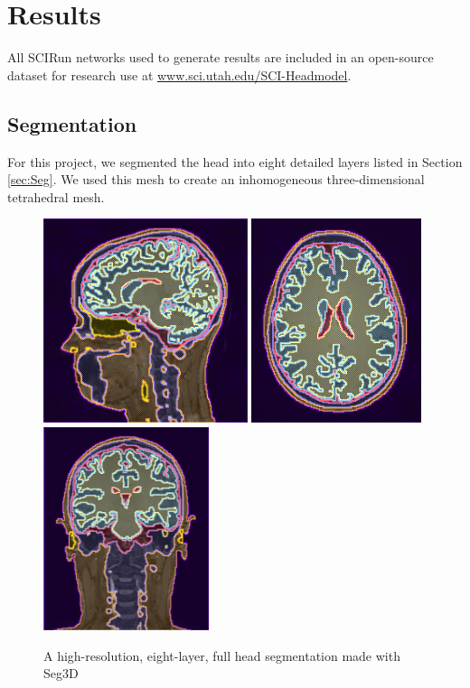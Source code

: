 %

\section{Results}
\label{sec:results}

All SCIRun networks used to generate results are included in an open-source dataset for research use at \url{www.sci.utah.edu/SCI-Headmodel}.

\subsection{Segmentation}

For this project, we segmented the head into eight detailed layers listed in Section \ref{sec:Seg}. We used this mesh to create an inhomogeneous three-dimensional tetrahedral mesh.

\begin{figure}[H]
\begin{center}
\includegraphics[height=2.35in]{Figures/seg_1}
\includegraphics[height=2.35in]{Figures/seg_2}
\includegraphics[height=2.35in]{Figures/seg_3}
\caption{A high-resolution, eight-layer, full head segmentation made with Seg3D}
\label{fig:fullseg}
\end{center}
\end{figure}

